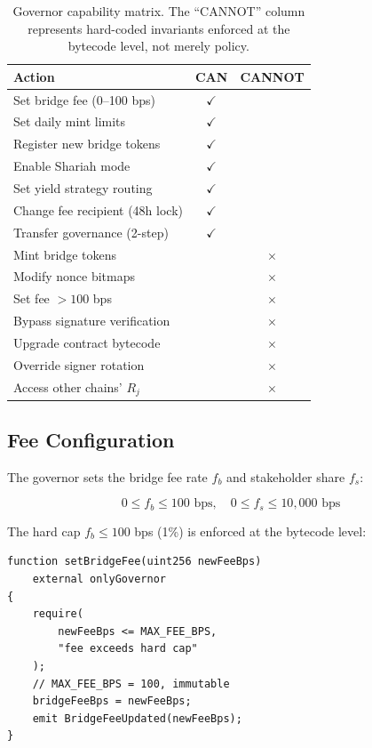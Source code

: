 \documentclass[11pt,twocolumn]{article}
\theoremstyle{definition}
\begin{document}
\begin{table}[h]
\centering
\small
\begin{tabular}{@{}p{3.8cm}cc@{}}
\toprule
\textbf{Action} & \textbf{CAN} & \textbf{CANNOT} \\
\midrule
Set bridge fee (0--100 bps) & $\checkmark$ & \\
Set daily mint limits & $\checkmark$ & \\
Register new bridge tokens & $\checkmark$ & \\
Enable Shariah mode & $\checkmark$ & \\
Set yield strategy routing & $\checkmark$ & \\
Change fee recipient (48h lock) & $\checkmark$ & \\
Transfer governance (2-step) & $\checkmark$ & \\
\midrule
Mint bridge tokens & & $\times$ \\
Modify nonce bitmaps & & $\times$ \\
Set fee $> 100$ bps & & $\times$ \\
Bypass signature verification & & $\times$ \\
Upgrade contract bytecode & & $\times$ \\
Override signer rotation & & $\times$ \\
Access other chains' $R_j$ & & $\times$ \\
\bottomrule
\end{tabular}
\caption{Governor capability matrix. The ``CANNOT'' column represents hard-coded invariants enforced at the bytecode level, not merely policy.}
\label{tab:capability}
\end{table}

\subsection{Fee Configuration}

The governor sets the bridge fee rate $f_b$ and stakeholder share $f_s$:

\begin{equation}
  0 \leq f_b \leq 100 \text{ bps}, \quad 0 \leq f_s \leq 10{,}000 \text{ bps}
\end{equation}

The hard cap $f_b \leq 100$ bps (1\%) is enforced at the bytecode level:

\begin{lstlisting}[language=Solidity,caption=Fee cap enforcement]
function setBridgeFee(uint256 newFeeBps)
    external onlyGovernor
{
    require(
        newFeeBps <= MAX_FEE_BPS,
        "fee exceeds hard cap"
    );
    // MAX_FEE_BPS = 100, immutable
    bridgeFeeBps = newFeeBps;
    emit BridgeFeeUpdated(newFeeBps);
}
\end{lstlisting}
\end{document}
